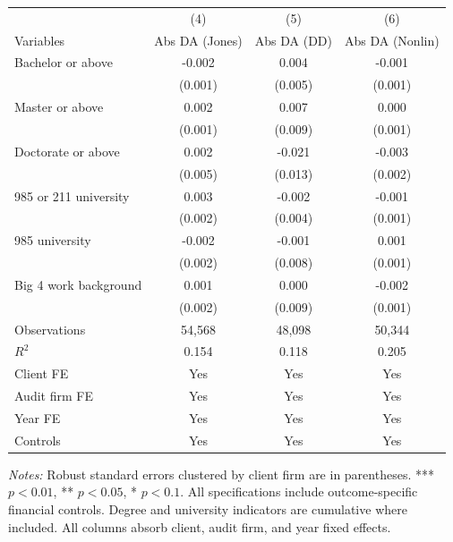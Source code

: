 \documentclass[10pt]{article}
\begin{document}
\begin{minipage}{19cm}\fontsize{10}{12}\selectfont\setlength{\tabcolsep}{4pt}\renewcommand{\arraystretch}{1.12}


\centering
{}
\begin{threeparttable}
\begin{tabular}{p{}ccc}
\toprule
 & (4) & (5) & (6) \\
Variables & Abs DA (Jones) & Abs DA (DD) & Abs DA (Nonlin) \\
\midrule
Bachelor or above & -0.002 & 0.004 & -0.001 \\
 & (0.001) & (0.005) & (0.001) \\
Master or above & 0.002 & 0.007 & 0.000 \\
 & (0.001) & (0.009) & (0.001) \\
Doctorate or above & 0.002 & -0.021 & -0.003 \\
 & (0.005) & (0.013) & (0.002) \\
985 or 211 university & 0.003 & -0.002 & -0.001 \\
 & (0.002) & (0.004) & (0.001) \\
985 university & -0.002 & -0.001 & 0.001 \\
 & (0.002) & (0.008) & (0.001) \\
Big 4 work background & 0.001 & 0.000 & -0.002 \\
 & (0.002) & (0.009) & (0.001) \\
Observations & 54,568 & 48,098 & 50,344 \\
$R^{2}$ & 0.154 & 0.118 & 0.205 \\
Client FE & Yes & Yes & Yes \\
Audit firm FE & Yes & Yes & Yes \\
Year FE & Yes & Yes & Yes \\
Controls & Yes & Yes & Yes \\
\bottomrule
\end{tabular}
\begin{tablenotes}\fontsize{9}{11}\selectfont
\item \raggedright \fontsize{9}{11}\selectfont \textit{Notes:} Robust standard errors clustered by client firm are in parentheses. *** $p<0.01$, ** $p<0.05$, * $p<0.1$. All specifications include outcome-specific financial controls. Degree and university indicators are cumulative where included.
All columns absorb client, audit firm, and year fixed effects.
\end{tablenotes}
\end{threeparttable}

\end{minipage}
\end{document}
